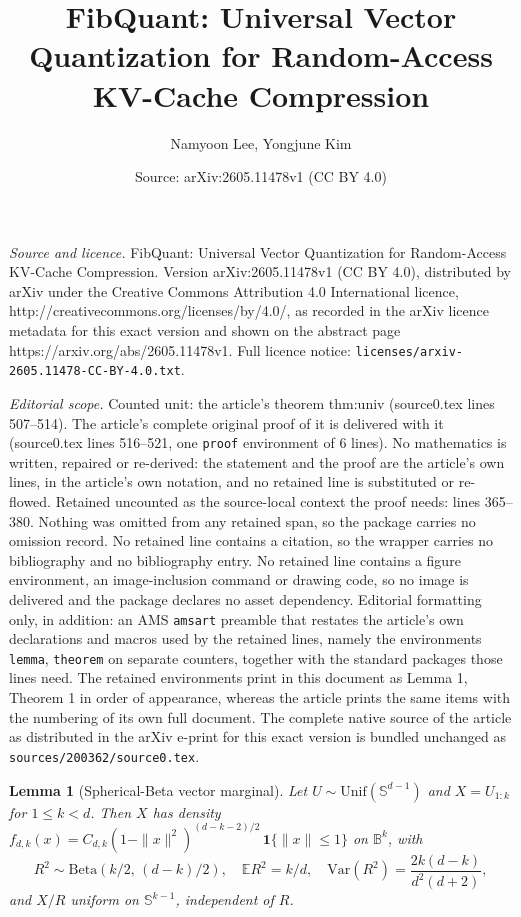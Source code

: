 \documentclass[10pt,a4paper]{amsart}
\title{FibQuant: Universal Vector Quantization for Random-Access KV-Cache Compression}
\author{Namyoon Lee, Yongjune Kim}
\date{Source: arXiv:2605.11478v1 (CC BY 4.0)}
\newtheorem{lemma}{Lemma}
\newcommand{\bbB}{\mathbb{B}}
\newcommand{\bbS}{\mathbb{S}}
\begin{document}
\maketitle

\noindent\emph{Source and licence.} FibQuant: Universal Vector Quantization for Random-Access KV-Cache Compression. Version arXiv:2605.11478v1 (CC BY 4.0), distributed by arXiv under the Creative Commons Attribution 4.0 International licence, http://creativecommons.org/licenses/by/4.0/, as recorded in the arXiv licence metadata for this exact version and shown on the abstract page https://arxiv.org/abs/2605.11478v1. Full licence notice: \texttt{licenses/arxiv-2605.11478-CC-BY-4.0.txt}.\par\smallskip

\noindent\textit{Editorial scope.} Counted unit: the article's theorem thm:univ (source0.tex lines 507--514). The article's complete original proof of it is delivered with it (source0.tex lines 516--521, one \texttt{proof} environment of 6 lines). No mathematics is written, repaired or re-derived: the statement and the proof are the article's own lines, in the article's own notation, and no retained line is substituted or re-flowed.  Retained uncounted as the source-local context the proof needs: lines 365--380.  Nothing was omitted from any retained span, so the package carries no omission record.  No retained line contains a citation, so the wrapper carries no bibliography and no bibliography entry.  No retained line contains a figure environment, an image-inclusion command or drawing code, so no image is delivered and the package declares no asset dependency.  Editorial formatting only, in addition: an AMS \texttt{amsart} preamble that restates the article's own declarations and macros used by the retained lines, namely the environments \texttt{lemma}, \texttt{theorem} on separate counters, together with the standard packages those lines need.  The retained environments print in this document as Lemma 1, Theorem 1 in order of appearance, whereas the article prints the same items with the numbering of its own full document.  The complete native source of the article as distributed in the arXiv e-print for this exact version is bundled unchanged as \texttt{sources/200362/source0.tex}.
\begin{lemma}[Spherical-Beta vector marginal]
\label{lem:sphbeta}
Let $U \sim \mathrm{Unif}(\bbS^{d - 1})$ and $X = U_{1:k}$ for
$1 \leq k < d$.  Then $X$ has density
$f_{d, k}(x) = C_{d, k}(1 - \|x\|^2)^{(d - k - 2)/2}\,\mathbf{1}\{\|x\|
\leq 1\}$ on $\bbB^k$, with
\begin{equation}
R^2 \sim \mathrm{Beta}\!\left(k/2,\,(d - k)/2\right),
\quad
\mathbb{E} R^2 = k/d,
\quad
\mathrm{Var}(R^2) = \frac{2 k(d - k)}{d^2 (d + 2)},
\label{eq:radial_law}
\end{equation}
and $X / R$ uniform on $\bbS^{k - 1}$, independent of $R$.
\end{lemma}
\end{document}
